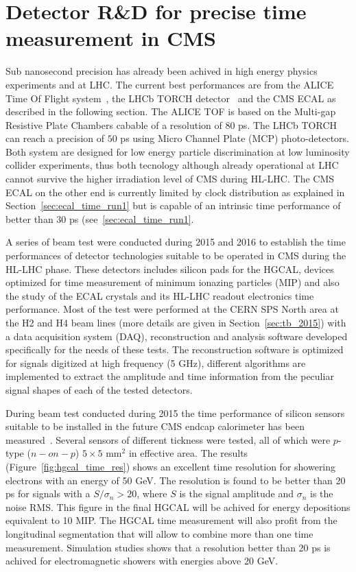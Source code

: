\section{Detector R\&D for precise time measurement in CMS}
Sub nanosecond precision has already been achived in high energy physics experiments and at LHC.
The current best performances are from the ALICE Time Of Flight system~\cite{alice_tof}, the LHCb TORCH
detector~\cite{lhcb_torch} and the CMS ECAL as described in the following section. The ALICE TOF is
based on the Multi-gap Resistive Plate Chambers cabable of a resolution of $80$ ps. The LHCb TORCH
can reach a precision of $50$ ps using Micro Channel Plate (MCP) photo-detectors. Both system are
designed for low energy particle discrimination at low luminosity collider experiments, thus both tecnology
although already operational at LHC cannot survive the higher irradiation level of CMS during HL-LHC.
The CMS ECAL on the other end is currently limited by clock distribution as explained in Section~\ref{sec:ecal_time_run1}
but is capable of an intrinsic time performance of better than $30$ ps (see~\ref{sec:ecal_time_run1}.

A series of beam test were conducted during 2015 and 2016 to establish the time performances of detector
technologies suitable to be operated in CMS during the HL-LHC phase. These detectors includes silicon
pads for the HGCAL, devices optimized for time measurement of minimum ionazing particles (MIP) and also the study of
the ECAL \PbWO crystals and its HL-LHC readout electronics time performance. Most of the test were performed at
the CERN SPS North area at the H2 and H4 beam lines (more details are given in Section~\ref{sec:tb_2015}) with
a data acquisition system (DAQ), reconstruction and analysis software developed specifically for the needs of
these tests. The reconstruction software is optimized for signals digitized at high frequency (5 GHz),
different algorithms are implemented to extract the amplitude and time information from the peculiar signal shapes of
each of the tested detectors.

During beam test conducted during 2015 the time performance of silicon sensors suitable to be installed
in the future CMS endcap calorimeter has been measured~\cite{hgcal_tb_time}. Several sensors of different
tickness were tested, all of which were $p$-type ($n-on-p$) $5\times 5$ mm$^2$ in effective area.
The results (Figure~\ref{fig:hgcal_time_res}) shows an excellent time resolution for showering electrons with an
energy of 50 GeV. The resolution is found to be better than 20 ps for signals with a $S/\sigma_n > 20$,  where
$S$ is the signal amplitude and $\sigma_n$ is the noise RMS. This figure in the final HGCAL will be achived for
energy depositions equivalent to 10 MIP. The HGCAL time measurement will also profit from the longitudinal segmentation that will
allow to combine more than one time measurement. Simulation studies shows that a resolution better than 20 ps is
achived for electromagnetic showers with energies above 20 GeV.

